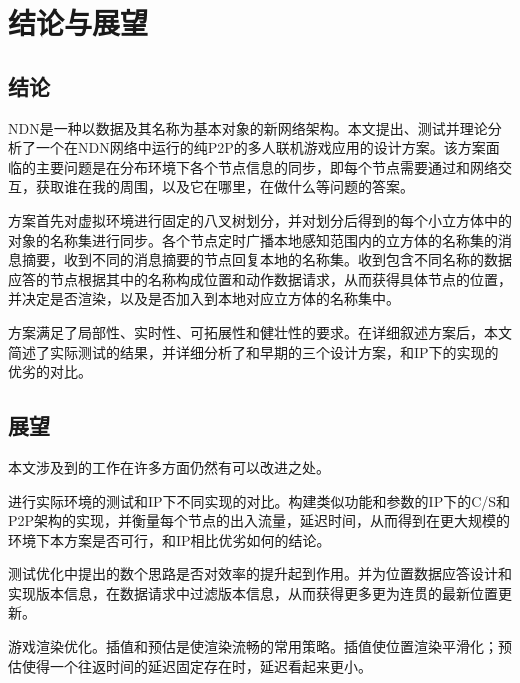 % 
%
%
% 
%
\chapter{结论与展望}
\label{ConclusionChapter}
\section{结论}
\par
NDN是一种以数据及其名称为基本对象的新网络架构。本文提出、测试并理论分析了一个在NDN网络中运行的纯P2P的多人联机游戏应用的设计方案。该方案面临的主要问题是在分布环境下各个节点信息的同步，即每个节点需要通过和网络交互，获取谁在我的周围，以及它在哪里，在做什么等问题的答案。
\par
方案首先对虚拟环境进行固定的八叉树划分，并对划分后得到的每个小立方体中的对象的名称集进行同步。各个节点定时广播本地感知范围内的立方体的名称集的消息摘要，收到不同的消息摘要的节点回复本地的名称集。收到包含不同名称的数据应答的节点根据其中的名称构成位置和动作数据请求，从而获得具体节点的位置，并决定是否渲染，以及是否加入到本地对应立方体的名称集中。
\par
方案满足了局部性、实时性、可拓展性和健壮性的要求。在详细叙述方案后，本文简述了实际测试的结果，并详细分析了和早期的三个设计方案，和IP下的实现的优劣的对比。
\section{展望}
\par
本文涉及到的工作在许多方面仍然有可以改进之处。
\par
进行实际环境的测试和IP下不同实现的对比。构建类似功能和参数的IP下的C/S和P2P架构的实现，并衡量每个节点的出入流量，延迟时间，从而得到在更大规模的环境下本方案是否可行，和IP相比优劣如何的结论。
\par
测试优化中提出的数个思路是否对效率的提升起到作用。并为位置数据应答设计和实现版本信息，在数据请求中过滤版本信息，从而获得更多更为连贯的最新位置更新。
\par
游戏渲染优化。插值和预估是使渲染流畅的常用策略。插值使位置渲染平滑化；预估使得一个往返时间的延迟固定存在时，延迟看起来更小。

